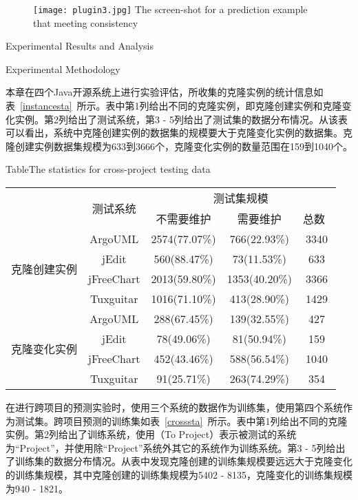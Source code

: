 \begin{figure}[htbp]
\centering
\texttt{[image: plugin3.jpg]}
{The screen-shot for a prediction example that meeting consistency}
\vspace{-1em}
\end{figure}

{Experimental Results and Analysis}

{Experimental Methodology}

本章在四个Java开源系统上进行实验评估，所收集的克隆实例的统计信息如表~\ref{instancesta}~所示。表中第1列给出不同的克隆实例，即克隆创建实例和克隆变化实例。第2列给出了测试系统，第3 - 5列给出了测试集的数据分布情况。从该表可以看出，系统中克隆创建实例的数据集的规模要大于克隆变化实例的数据集。克隆创建实例数据集规模为633到3666个，克隆变化实例的数量范围在159到1040个。

\begin{table}[h]
{Table$\!$}{The statistics for cross-project testing data}
\vspace{0.5em}
\centering
\wuhao
\begin{tabular}{ccccc}
\toprule[1.5pt]
~\multirow{2}{*}{类型}&\multirow{2}{*}{测试系统}&\multicolumn{3}{c}{测试集规模}\\
~&~&{不需要维护}&{需要维护}&{总数}~\\
\midrule[1pt]
\multirow{4}{*}{克隆创建实例}
&ArgoUML&	2574(77.07\%)&	766(22.93\%)&	3340\\
&jEdit&560(88.47\%)&	73(11.53\%)&	633\\
&jFreeChart&	2013(59.80\%)&	1353(40.20\%)&	3366\\
&Tuxguitar&	1016(71.10\%)&	413(28.90\%)&	1429\\
\multirow{4}{*}{克隆变化实例}
&ArgoUML&288(67.45\%)&139(32.55\%)&427\\
&jEdit&78(49.06\%)&81(50.94\%)&159\\
&jFreeChart&452(43.46\%)&588(56.54\%)&1040\\
&Tuxguitar&91(25.71\%)&263(74.29\%)&354\\
\bottomrule[1.5pt]
\end{tabular}
\end{table}

在进行跨项目的预测实验时，使用三个系统的数据作为训练集，使用第四个系统作为测试集。跨项目预测的训练集如表~\ref{crosssta}~所示。表中第1列给出不同的克隆实例。第2列给出了训练系统，使用（To Project）表示被测试的系统为“Project”，并使用除“Project”系统外其它的系统作为训练系统。第3 - 5列给出了训练集的数据分布情况。从表中发现克隆创建的训练集规模要远远大于克隆变化的训练集规模，其中克隆创建的训练集规模为5402 - 8135，克隆变化的训练集规模为940 - 1821。

